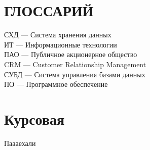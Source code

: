 \documentclass[14pt, a4paper]{extarticle}
\begin{document}
\section*{ГЛОССАРИЙ}
\begin{raggedright}
	СХД --- Система хранения данных \\
	ИТ --- Информационные технологии \\
	ПАО --- Публичное акционерное общество \\ 
	CRM --- Customer Relationship Management \\
  	СУБД --- Система управления базами данных \\
  	ПО --- Программное обеспечение \\
\end{raggedright}

\section{Курсовая}
Паааехали
\end{document}
